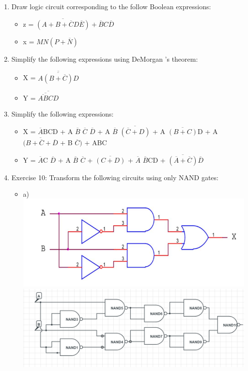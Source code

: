 \documentclass[12pt]{article}
\begin{document}
\begin{enumerate}
	\item Draw logic circuit corresponding to the follow Boolean expressions:
	\begin{itemize}
		\item z = $\overline{(A+B+\overline{C}D \overline{E})} + \overline{B}C \overline{D}$
		\item x = $MN(P + \overline{N})$
	\end{itemize}
	\item Simplify the following expressions using DeMorgan 's theorem:
	\begin{itemize}
		\item X = $\overline{A \overline{(B + \overline{C})}D}$
		\item Y = $\overline{\overline{\overline{AB}C}D}$
	\end{itemize}
	\item Simplify the following expressions:
	\begin{itemize}
		\item X = $\overline{A}$BCD + A $\overline{B}$ $\overline{C}$ $\overline{D}$ + A $\overline{B}$ $\overline{(\overline{C} + D)}$ + A $\overline{(B + C)}$D + A $\overline{(B + \overline{C} + \overline{D}}$ + B $\overline{C})$ + ABC
		\item Y = $\overline{A}$C $\overline{D}$ + A $\overline{B}$ $\overline{C}$ + $\overline{(C + D)}$ + $\overline{A}$ $\overline{B}$CD + $\overline{(\overline{A} + \overline{C})} \overline{D}$
	\end{itemize}
	\item Exercise 10: Transform the following circuits using only NAND gates:
	\begin{itemize}
		\item a)\\
		\includegraphics[scale = 1.05]{hinh.png}\\
		\includegraphics[scale = 0.65]{Bai10a.png}

\end{itemize}
\end{enumerate}
\end{document}
